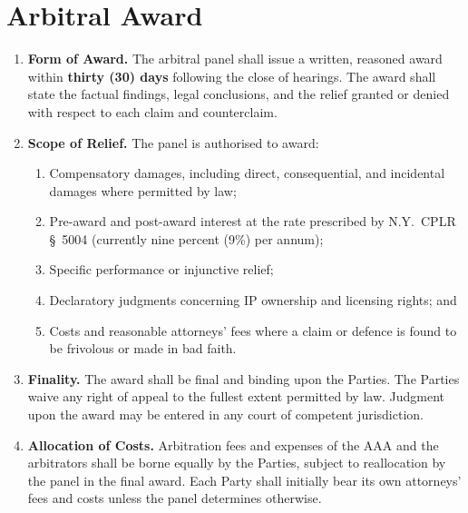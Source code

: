 \documentclass[11pt,a4paper]{article}
\begin{document}
\section{Arbitral Award}

\begin{enumerate}
  \item \textbf{Form of Award.} The arbitral panel shall issue a written,
    reasoned award within \textbf{thirty (30) days} following the close of
    hearings. The award shall state the factual findings, legal conclusions,
    and the relief granted or denied with respect to each claim and
    counterclaim.

  \item \textbf{Scope of Relief.} The panel is authorised to award:
    \begin{enumerate}
      \item Compensatory damages, including direct, consequential, and
        incidental damages where permitted by law;
      \item Pre-award and post-award interest at the rate prescribed by
        N.Y.\ CPLR \S\ 5004 (currently nine percent (9\%) per annum);
      \item Specific performance or injunctive relief;
      \item Declaratory judgments concerning IP ownership and licensing
        rights; and
      \item Costs and reasonable attorneys' fees where a claim or defence is
        found to be frivolous or made in bad faith.
    \end{enumerate}

  \item \textbf{Finality.} The award shall be final and binding upon the
    Parties. The Parties waive any right of appeal to the fullest extent
    permitted by law. Judgment upon the award may be entered in any court
    of competent jurisdiction.

  \item \textbf{Allocation of Costs.} Arbitration fees and expenses of the
    AAA and the arbitrators shall be borne equally by the Parties, subject
    to reallocation by the panel in the final award. Each Party shall
    initially bear its own attorneys' fees and costs unless the panel
    determines otherwise.
\end{enumerate}
\end{document}
